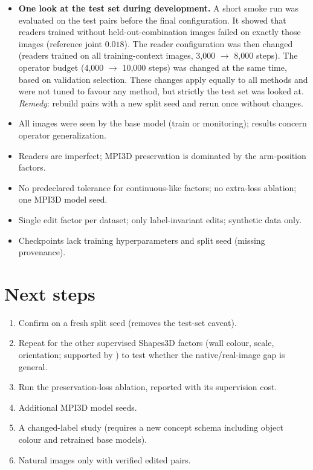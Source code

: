 \documentclass[11pt,a4paper]{article}
\newcommand{\code}[1]{\texttt{\detokenize{#1}}}
\begin{document}
\begin{itemize}
\item \textbf{One look at the test set during development.} A short smoke run was evaluated on the test pairs before
  the final configuration. It showed that readers trained without held-out-combination images failed on exactly those
  images (reference joint $0.018$). The reader configuration was then changed (readers trained on all
  training-context images, 3{,}000 $\to$ 8{,}000 steps). The operator budget (4{,}000 $\to$ 10{,}000 steps) was changed
  at the same time, based on validation selection. These changes apply equally to all methods and were not tuned to
  favour any method, but strictly the test set was looked at. \emph{Remedy}: rebuild pairs with a new split seed and
  rerun once without changes.
\item All images were seen by the base model (train or monitoring); results concern operator generalization.
\item Readers are imperfect; MPI3D preservation is dominated by the arm-position factors.
\item No predeclared tolerance for continuous-like factors; no extra-loss ablation; one MPI3D model seed.
\item Single edit factor per dataset; only label-invariant edits; synthetic data only.
\item Checkpoints lack training hyperparameters and split seed (missing provenance).
\end{itemize}

\section{Next steps}

\begin{enumerate}
\item Confirm on a fresh split seed (removes the test-set caveat).
\item Repeat for the other supervised Shapes3D factors (wall colour, scale, orientation; supported by
  \code{build_pairs.py --edit}) to test whether the native/real-image gap is general.
\item Run the preservation-loss ablation, reported with its supervision cost.
\item Additional MPI3D model seeds.
\item A changed-label study (requires a new concept schema including object colour and retrained base models).
\item Natural images only with verified edited pairs.
\end{enumerate}
\end{document}
